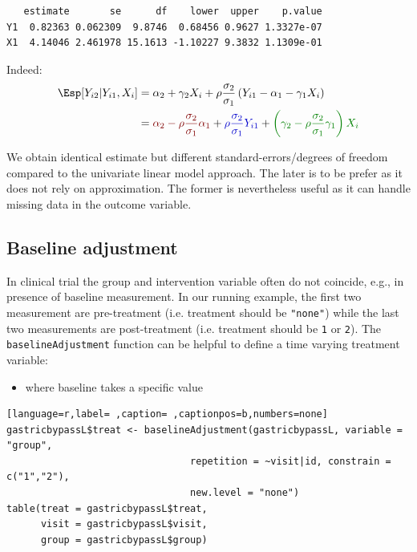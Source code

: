 \documentclass[12pt]{article}
\newcommand{\darkblue}{blue!80!black}
\newcommand{\darkgreen}{green!50!black}
\newcommand{\darkred}{red!50!black}
\begin{document}
\begin{verbatim}
   estimate       se      df    lower  upper    p.value
Y1  0.82363 0.062309  9.8746  0.68456 0.9627 1.3327e-07
X1  4.14046 2.461978 15.1613 -1.10227 9.3832 1.1309e-01
\end{verbatim}


Indeed:
\begin{align*}
\Esp[Y_{i2}|Y_{i1},X_{i}] &= \alpha_2 + \gamma_2 X_{i} + \rho \frac{\sigma_2}{\sigma_1}\left(Y_{i1} - \alpha_1 - \gamma_1 X_{i}\right) \\
                         &= \textcolor{\darkred}{\alpha_2 - \rho \frac{\sigma_2}{\sigma_1} \alpha_1}
                         + \textcolor{\darkblue}{\rho \frac{\sigma_2}{\sigma_1}Y_{i1}}
                         + \textcolor{\darkgreen}{\left(\gamma_2 - \rho \frac{\sigma_2}{\sigma_1} \gamma_1\right)  X_{i} }
\end{align*}

We obtain identical estimate but different standard-errors/degrees of
freedom compared to the univariate linear model approach. The later is
to be prefer as it does not rely on approximation. The former is
nevertheless useful as it can handle missing data in the outcome
variable.

\clearpage

\subsection{Baseline adjustment}
\label{sec:org03abb18}

In clinical trial the group and intervention variable often do not
coincide, e.g., in presence of baseline measurement. In our running
example, the first two measurement are pre-treatment (i.e. treatment
should be \texttt{"none"}) while the last two measurements are post-treatment
(i.e. treatment should be \texttt{1} or \texttt{2}). The \texttt{baselineAdjustment}
function can be helpful to define a time varying treatment variable:
\begin{itemize}
\item where baseline takes a specific value
\end{itemize}
\begin{lstlisting}[language=r,label= ,caption= ,captionpos=b,numbers=none]
gastricbypassL$treat <- baselineAdjustment(gastricbypassL, variable = "group",
                                repetition = ~visit|id, constrain = c("1","2"),
                                new.level = "none")
table(treat = gastricbypassL$treat,
      visit = gastricbypassL$visit,
      group = gastricbypassL$group)
\end{lstlisting}
\end{document}
